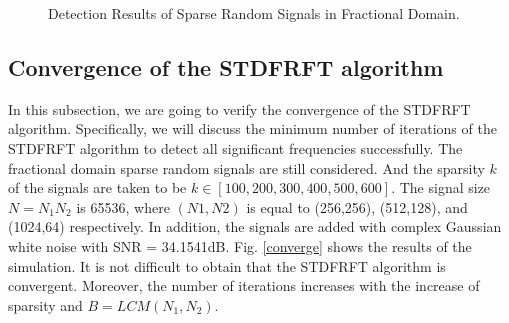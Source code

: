 \documentclass[conference]{IEEEtran}
\begin{document}
\begin{figure}[t]
	\caption{Detection Results of Sparse Random Signals in Fractional Domain.}  %
	\label{det_sparse}
\end{figure}

\subsection{{Convergence of the STDFRFT algorithm}} 
{In this subsection, we are going to verify the convergence of the STDFRFT algorithm. Specifically, we will discuss the minimum number of iterations of the STDFRFT algorithm to detect all significant frequencies successfully. The fractional domain sparse random signals are still considered. And the sparsity $k$ of the signals are taken to be $k \in [100,200,300,400,500,600]$. The signal size $N=N_1N_2$ is 65536, where $(N1,N2)$ is equal to (256,256), (512,128), and (1024,64) respectively. In addition, the signals are added with complex Gaussian white noise with SNR = 34.1541dB. Fig. \ref{converge} shows the results of the simulation. It is not difficult to obtain that the STDFRFT algorithm is convergent. Moreover, the number of iterations increases with the increase of sparsity and $B=LCM(N_1,N_2)$.}
\end{document}
